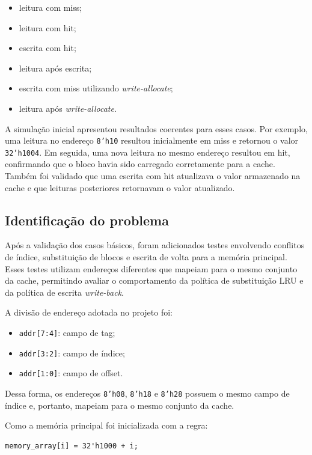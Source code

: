 ﻿\documentclass[12pt,a4paper]{article}
\begin{document}
\begin{itemize}
    \item leitura com miss;
    \item leitura com hit;
    \item escrita com hit;
    \item leitura após escrita;
    \item escrita com miss utilizando \textit{write-allocate};
    \item leitura após \textit{write-allocate}.
\end{itemize}

A simulação inicial apresentou resultados coerentes para esses casos. Por exemplo, uma leitura no endereço \texttt{8'h10} resultou inicialmente em miss e retornou o valor \texttt{32'h1004}. Em seguida, uma nova leitura no mesmo endereço resultou em hit, confirmando que o bloco havia sido carregado corretamente para a cache. Também foi validado que uma escrita com hit atualizava o valor armazenado na cache e que leituras posteriores retornavam o valor atualizado.

\subsection{Identificação do problema}

Após a validação dos casos básicos, foram adicionados testes envolvendo conflitos de índice, substituição de blocos e escrita de volta para a memória principal. Esses testes utilizam endereços diferentes que mapeiam para o mesmo conjunto da cache, permitindo avaliar o comportamento da política de substituição LRU e da política de escrita \textit{write-back}.

A divisão de endereço adotada no projeto foi:

\begin{itemize}
    \item \texttt{addr[7:4]}: campo de tag;
    \item \texttt{addr[3:2]}: campo de índice;
    \item \texttt{addr[1:0]}: campo de offset.
\end{itemize}

Dessa forma, os endereços \texttt{8'h08}, \texttt{8'h18} e \texttt{8'h28} possuem o mesmo campo de índice e, portanto, mapeiam para o mesmo conjunto da cache.

Como a memória principal foi inicializada com a regra:

\begin{verbatim}
memory_array[i] = 32'h1000 + i;
\end{verbatim}
\end{document}

